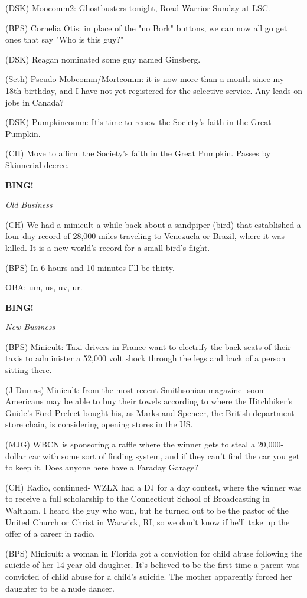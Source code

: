 \documentclass[12pt]{article}
\newcommand{\bing}{{\bf BING!} }
\newcommand{\goto}[1]{\bing \vskip 12pt \centerline{{\em{#1}}}}
\begin{document}
(DSK) Moocomm2: Ghostbusters tonight, Road Warrior Sunday at LSC.

(BPS) Cornelia Otis: in place of the "no Bork" buttons, we can now all go get ones that say "Who is this guy?"

(DSK) Reagan nominated some guy named Ginsberg.

(Seth) Pseudo-Mobcomm/Mortcomm: it is now more than a month since my 18th birthday, and I have not yet registered for the selective service. Any leads on jobs in Canada?

(DSK) Pumpkincomm: It's time to renew the Society's faith in the Great Pumpkin.

(CH) Move to affirm the Society's faith in the Great Pumpkin. Passes by Skinnerial decree.

\goto{Old Business}

(CH) We had a minicult a while back about a sandpiper (bird) that established a four-day record of 28,000 miles traveling to Venezuela or Brazil, where it was killed. It is a new world's record for a small bird's flight.

(BPS) In 6 hours and 10 minutes I'll be thirty.

OBA: um, us, uv, ur.

\goto{New Business}

(BPS) Minicult: Taxi drivers in France want to electrify the back seats of their taxis to administer a 52,000 volt shock through the legs and back of a person sitting there.

(J Dumas) Minicult: from the most recent Smithsonian magazine- soon Americans may be able to buy their towels according to where the Hitchhiker's Guide's Ford Prefect bought his, as Marks and Spencer, the British department store chain, is considering opening stores in the US.

(MJG) WBCN is sponsoring a raffle where the winner gets to steal a 20,000-dollar car with some sort of finding system, and if they can't find the car you get to keep it. Does anyone here have a Faraday Garage?

(CH) Radio, continued- WZLX had a DJ for a day contest, where the winner was to receive a full scholarship to the Connecticut School of Broadcasting in Waltham. I heard the guy who won, but he turned out to be the pastor of the United Church or Christ in Warwick, RI, so we don't know if he'll take up the offer of a career in radio.

(BPS) Minicult: a woman in Florida got a conviction for child abuse following the suicide of her 14 year old daughter. It's believed to be the first time a parent was convicted of child abuse for a child's suicide. The mother apparently forced her daughter to be a nude dancer.
\end{document}

